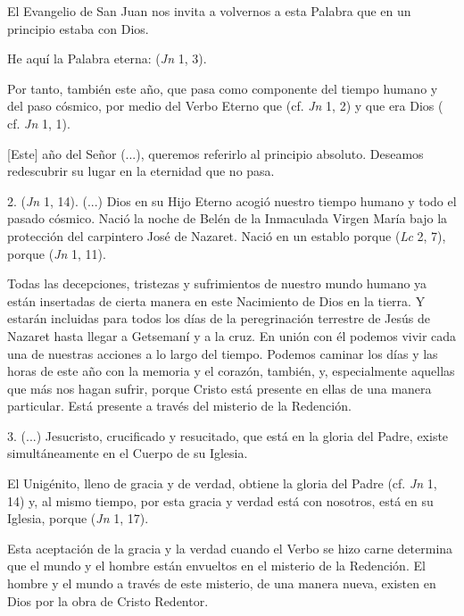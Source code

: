 \begin{body}
	El Evangelio de San Juan nos invita a volvernos a esta Palabra que en un principio estaba con Dios.
	
	He aquí la Palabra eterna:  (\emph{Jn} 1, 3).
	
	Por tanto, también este año, que pasa como componente del tiempo humano y del paso cósmico,  por medio del Verbo Eterno que  (cf. \emph{Jn} 1, 2) y que era Dios ( cf. \emph{Jn} 1, 1).
	
	{[}Este{]} año del Señor (...), queremos referirlo al principio absoluto. Deseamos redescubrir su lugar en la eternidad que no pasa.
	
	2.  (\emph{Jn} 1, 14). (...) Dios en su Hijo Eterno acogió nuestro tiempo humano y todo el pasado cósmico. Nació la noche de Belén de la Inmaculada Virgen María bajo la protección del carpintero José de Nazaret. Nació en un establo porque  (\emph{Lc} 2, 7), porque  (\emph{Jn} 1, 11).
	
	Todas las decepciones, tristezas y sufrimientos de nuestro mundo humano ya están insertadas de cierta manera en este Nacimiento de Dios en la tierra. Y estarán incluidas para todos los días de la peregrinación terrestre de Jesús de Nazaret hasta llegar a Getsemaní y a la cruz. En unión con él podemos vivir cada una de nuestras acciones a lo largo del tiempo. Podemos caminar los días y las horas de este año con la memoria y el corazón, también, y, especialmente aquellas que más nos hagan sufrir, porque Cristo está presente en ellas de una manera particular. Está presente a través del misterio de la Redención.
	
	3. (...) Jesucristo, crucificado y resucitado, que está en la gloria del Padre, existe simultáneamente en el Cuerpo de su Iglesia.
	
	El Unigénito, lleno de gracia y de verdad, obtiene la gloria del Padre (cf. \emph{Jn} 1, 14) y, al mismo tiempo, por esta gracia y verdad está con nosotros, está en su Iglesia, porque  (\emph{Jn} 1, 17).
	
	Esta aceptación de la gracia y la verdad cuando el Verbo se hizo carne determina que el mundo y el hombre están envueltos en el misterio de la Redención. El hombre y el mundo a través de este misterio, de una manera nueva, existen en Dios por la obra de Cristo Redentor.
	

\end{body}
